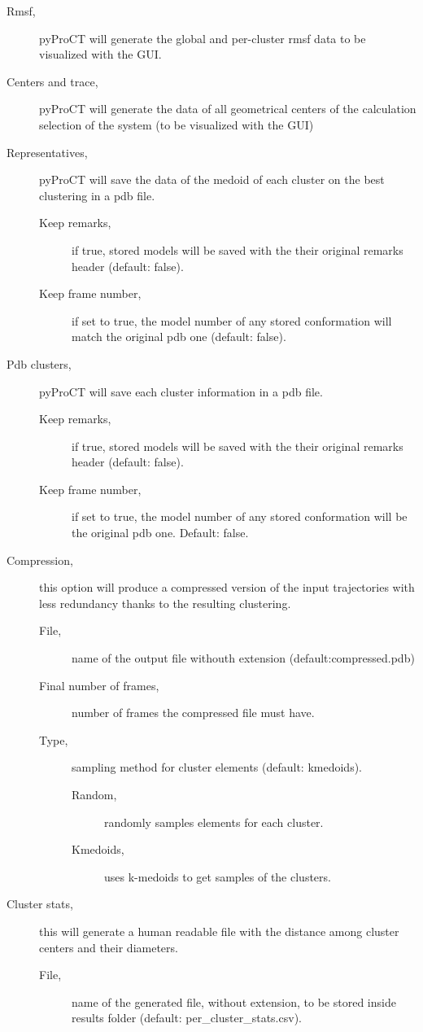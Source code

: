\begin{description}
\item [Rmsf,] pyProCT will generate the global and per-cluster
rmsf data to be visualized with the GUI.
\item [Centers and trace,] pyProCT will generate the data of all geometrical centers of the calculation selection of the system (to be visualized with the GUI)
\item [Representatives,] pyProCT will save the data of the medoid of each cluster on the best clustering in a pdb file.
\begin{description}
\item [Keep remarks,] if true, stored models will be saved with the their original remarks header (default: false).
\item [Keep frame number,] if set to true, the model number of any stored conformation will match the original pdb one (default: false).
\end{description}
\item [Pdb clusters,] pyProCT will save each cluster information in a pdb file.
\begin{description}
\item [Keep remarks,] if true, stored models will be saved with the their original remarks header (default: false).
\item [Keep frame number,] if set to true, the model number of any stored conformation will be the original pdb one. Default: false.
\end{description}
\item [Compression,] this option will produce a compressed version of the input trajectories with less redundancy thanks to the resulting clustering.
\begin{description}
\item [File,] name of the output file withouth extension (default:compressed.pdb)
\item [Final number of frames,] number of frames the compressed file must have.
\item [Type,] sampling method for cluster elements (default: kmedoids).
\begin{description}
\item [Random,] randomly samples elements for each cluster.
\item [Kmedoids,] uses k-medoids to get samples of the clusters.
\end{description}
\end{description}
\item [Cluster stats,] this will generate a human readable file with the distance among cluster centers and their diameters.  
\begin{description}
\item [File,] name of the generated file, without extension, to be stored inside results folder (default: per\_cluster\_stats.csv).
\end{description}
\end{description}

